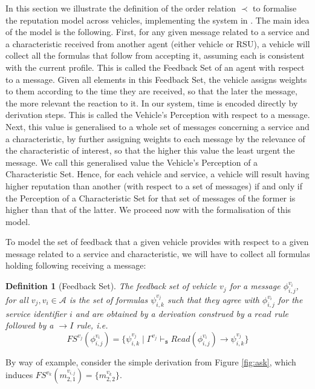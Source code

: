 \documentclass[compsoc, conference, letterpaper, 10pt, times]{IEEEtran}
\newtheorem{definition}{Definition}
\begin{document}
In this section we illustrate the definition of the order relation $\prec$ to formalise the reputation model across vehicles, implementing the system in \cite{glenford}. The main idea of the model is the following. First, for any given message related to a service and a characteristic received from another agent (either vehicle or RSU), a vehicle will collect all the formulas that follow from accepting it, assuming each is consistent with the current profile. This is called the Feedback Set of an agent with respect to a message. Given all elements in this Feedback Set, the vehicle assigns weights to them according to the time they are received, so that the later the message, the more relevant the reaction to it. In our system, time is encoded directly by derivation steps. This is called the Vehicle's Perception with respect to a message. Next, this value is generalised to a whole set of messages concerning a service and a characteristic, by further assigning weights to each message by the relevance of the characteristic of interest, so that the higher this value the least urgent the message. We call this generalised value the Vehicle's Perception of a Characteristic Set. Hence, for each vehicle and service, a vehicle will result having higher reputation than another (with respect to a set of messages) if and only if the Perception of a Characteristic Set for that set of messages of the former is higher than that of the latter. We proceed now with the formalisation of this model.

To model the set of feedback that a given vehicle provides with respect to a given message related to a service and characteristic, we will have to collect all formulas holding following receiving a message:

\begin{definition}[Feedback Set]
The feedback set of vehicle $v_{j}$ for a message $\phi^{v_{i}}_{i,j}$, for all $v_{j}, v_{i} \in \mathcal{A}$ is the set of formulas $\psi^{v_{j}}_{i,k}$ such that they agree with $\phi^{v_{i}}_{i,j}$ for the service identifier $i$ and are obtained by a derivation construed by a $read$ rule followed by a $\rightarrow I$ rule, i.e.
%
\[
FS^{v_{j}}(\phi^{v_{i}}_{i,j})=\{ \psi^{v_{j}}_{i,k}\mid \Gamma^{v_{j}}
\vdash_{\mathtt{s}}  Read(\phi^{v_{i}}_{i,j})\rightarrow \psi^{v_{j}}_{i,k}  \}
\]
\end{definition}
By way of example, consider the simple derivation from Figure \ref{fig:ask}, which induces $FS^{v_{k}}(m^{v_{i,j}}_{2,1})=\{m^{v_{k}}_{2,2}\}$.
\end{document}

